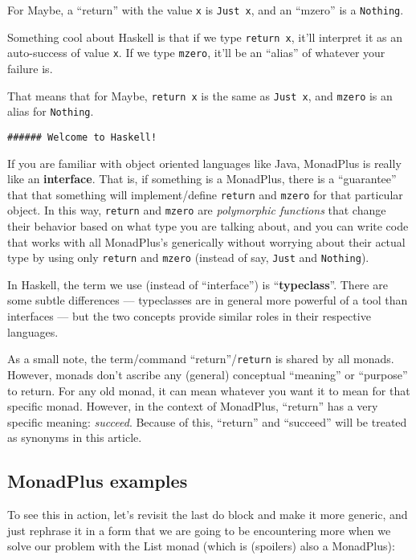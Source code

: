 \documentclass[]{article}
\begin{document}
For Maybe, a ``return'' with the value \texttt{x} is \texttt{Just\ x}, and an ``mzero'' is a
\texttt{Nothing}.

Something cool about Haskell is that if we type \texttt{return\ x}, it'll interpret it as an
auto-success of value \texttt{x}. If we type \texttt{mzero}, it'll be an ``alias'' of whatever your
failure is.

That means that for Maybe, \texttt{return\ x} is the same as \texttt{Just\ x}, and \texttt{mzero} is
an alias for \texttt{Nothing}.

\begin{verbatim}
###### Welcome to Haskell!
\end{verbatim}

If you are familiar with object oriented languages like Java, MonadPlus is really like an
\textbf{interface}. That is, if something is a MonadPlus, there is a ``guarantee'' that that
something will implement/define \texttt{return} and \texttt{mzero} for that particular object. In
this way, \texttt{return} and \texttt{mzero} are \emph{polymorphic functions} that change their
behavior based on what type you are talking about, and you can write code that works with all
MonadPlus's generically without worrying about their actual type by using only \texttt{return} and
\texttt{mzero} (instead of say, \texttt{Just} and \texttt{Nothing}).

In Haskell, the term we use (instead of ``interface'') is ``\textbf{typeclass}''. There are some
subtle differences --- typeclasses are in general more powerful of a tool than interfaces --- but
the two concepts provide similar roles in their respective languages.

As a small note, the term/command ``return''/\texttt{return} is shared by all monads. However,
monads don't ascribe any (general) conceptual ``meaning'' or ``purpose'' to return. For any old
monad, it can mean whatever you want it to mean for that specific monad. However, in the context of
MonadPlus, ``return'' has a very specific meaning: \emph{succeed}. Because of this, ``return'' and
``succeed'' will be treated as synonyms in this article.

\subsection{MonadPlus examples}\label{monadplus-examples}

To see this in action, let's revisit the last do block and make it more generic, and just rephrase
it in a form that we are going to be encountering more when we solve our problem with the List monad
(which is (spoilers) also a MonadPlus):
\end{document}
